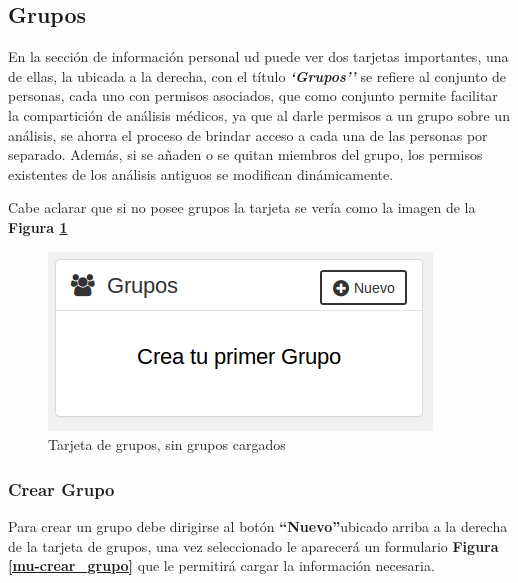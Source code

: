 \subsection{Grupos}    
En la sección de información personal ud puede ver dos tarjetas     importantes, una de ellas, la ubicada a la derecha, con el título \textbf{\textit{`Grupos''}} se refiere al conjunto de personas, cada uno con permisos asociados, que como conjunto permite facilitar la compartición de análisis médicos, ya que al darle permisos a un grupo sobre un análisis, se ahorra el proceso de brindar acceso a cada una de las personas por separado. Además, si se añaden o se quitan miembros del grupo, los permisos existentes de los análisis antiguos se modifican dinámicamente.

Cabe aclarar que si no posee  grupos la tarjeta se vería como la imagen de la \textbf{Figura \ref{mu-sin_grupos}}
     \begin{figure}
     	\centering
     	\includegraphics[width=.5\textwidth]{img/manual_de_usuario/sin_grupos}
     	\caption{Tarjeta de grupos, sin grupos cargados}
     	\label{mu-sin_grupos}
     \end{figure}   
\subsubsection{Crear Grupo}
Para crear un grupo debe dirigirse al botón \textbf{``Nuevo''}ubicado arriba a la derecha de la tarjeta de grupos, una vez seleccionado le aparecerá un formulario \textbf{Figura \ref{mu-crear_grupo}} que le permitirá cargar la información necesaria.

